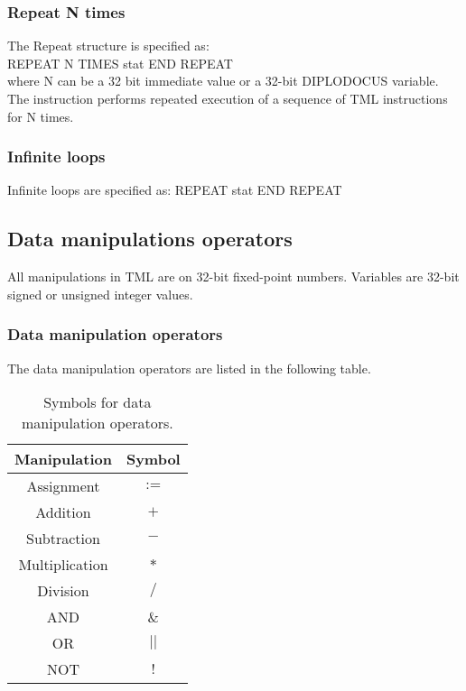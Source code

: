 \documentclass[12pt]{article}
\begin{document}
\subsubsection{Repeat N times}
The Repeat structure is specified as:\\

REPEAT N TIMES stat END REPEAT\\

where N can be a 32 bit immediate value or a 32-bit DIPLODOCUS variable. The instruction performs repeated execution of a sequence of TML instructions for N times. \\


\subsubsection{Infinite loops}

Infinite loops are specified as: 
REPEAT stat END REPEAT\\

\subsection{Data manipulations operators}

All manipulations in TML are on 32-bit fixed-point numbers. Variables are 32-bit signed or unsigned integer values.\\


\subsubsection{Data manipulation operators}
The data manipulation operators are listed in the following table.

\begin{table}[ht]
\begin{center}
\begin{tabular}{|c|c|}
  \hline
  Manipulation & Symbol \\
  \hline
  \hline
  Assignment &  $:=$  \\
  \hline
  Addition & $+$\\
  \hline
  Subtraction &  $-$ \\
  \hline
  Multiplication & $*$ \\
  \hline
  Division & $/$ \\
  \hline
  AND & $\&$ \\
  \hline
  OR & $||$ \\
  \hline
  NOT & $!$ \\
  \hline

\end{tabular}
\end{center}
\caption{Symbols for data manipulation operators.}
\end{table}
\end{document}
